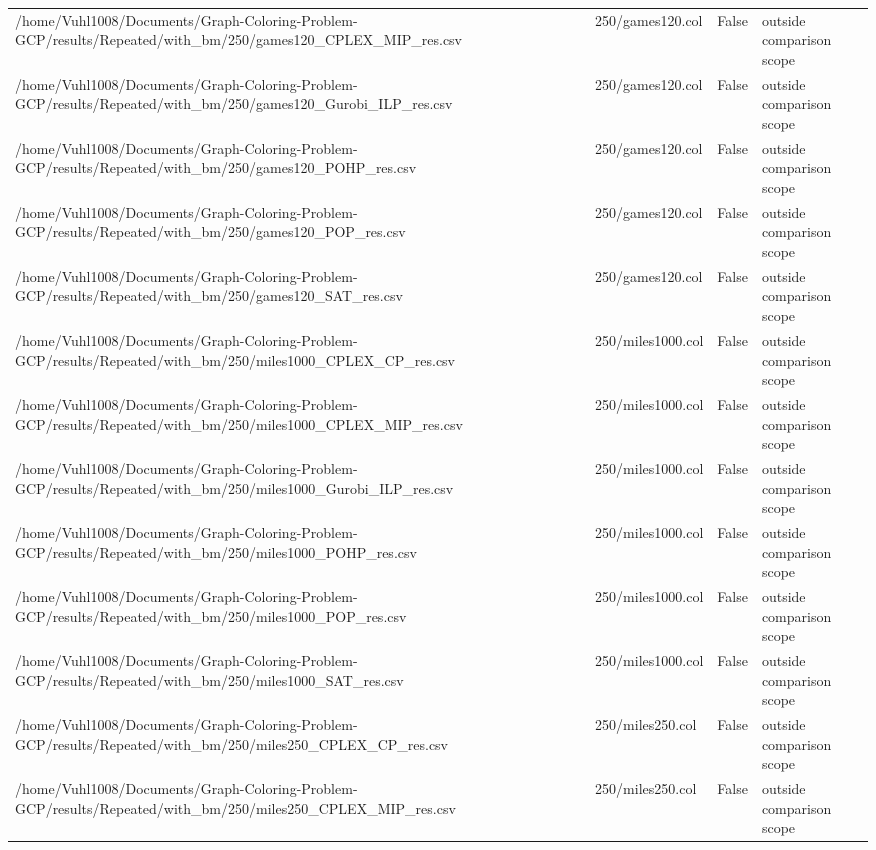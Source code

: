 \begin{table}[htbp]
\begin{tabular}{llll}
/home/Vuhl1008/Documents/Graph-Coloring-Problem-GCP/results/Repeated/with\_bm/250/games120\_CPLEX\_MIP\_res.csv & 250/games120.col & False & outside comparison scope \\
/home/Vuhl1008/Documents/Graph-Coloring-Problem-GCP/results/Repeated/with\_bm/250/games120\_Gurobi\_ILP\_res.csv & 250/games120.col & False & outside comparison scope \\
/home/Vuhl1008/Documents/Graph-Coloring-Problem-GCP/results/Repeated/with\_bm/250/games120\_POHP\_res.csv & 250/games120.col & False & outside comparison scope \\
/home/Vuhl1008/Documents/Graph-Coloring-Problem-GCP/results/Repeated/with\_bm/250/games120\_POP\_res.csv & 250/games120.col & False & outside comparison scope \\
/home/Vuhl1008/Documents/Graph-Coloring-Problem-GCP/results/Repeated/with\_bm/250/games120\_SAT\_res.csv & 250/games120.col & False & outside comparison scope \\
/home/Vuhl1008/Documents/Graph-Coloring-Problem-GCP/results/Repeated/with\_bm/250/miles1000\_CPLEX\_CP\_res.csv & 250/miles1000.col & False & outside comparison scope \\
/home/Vuhl1008/Documents/Graph-Coloring-Problem-GCP/results/Repeated/with\_bm/250/miles1000\_CPLEX\_MIP\_res.csv & 250/miles1000.col & False & outside comparison scope \\
/home/Vuhl1008/Documents/Graph-Coloring-Problem-GCP/results/Repeated/with\_bm/250/miles1000\_Gurobi\_ILP\_res.csv & 250/miles1000.col & False & outside comparison scope \\
/home/Vuhl1008/Documents/Graph-Coloring-Problem-GCP/results/Repeated/with\_bm/250/miles1000\_POHP\_res.csv & 250/miles1000.col & False & outside comparison scope \\
/home/Vuhl1008/Documents/Graph-Coloring-Problem-GCP/results/Repeated/with\_bm/250/miles1000\_POP\_res.csv & 250/miles1000.col & False & outside comparison scope \\
/home/Vuhl1008/Documents/Graph-Coloring-Problem-GCP/results/Repeated/with\_bm/250/miles1000\_SAT\_res.csv & 250/miles1000.col & False & outside comparison scope \\
/home/Vuhl1008/Documents/Graph-Coloring-Problem-GCP/results/Repeated/with\_bm/250/miles250\_CPLEX\_CP\_res.csv & 250/miles250.col & False & outside comparison scope \\
/home/Vuhl1008/Documents/Graph-Coloring-Problem-GCP/results/Repeated/with\_bm/250/miles250\_CPLEX\_MIP\_res.csv & 250/miles250.col & False & outside comparison scope \\

\end{tabular}
\end{table}
